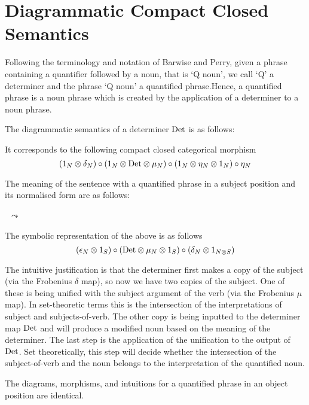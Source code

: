 \section{Diagrammatic  Compact Closed Semantics}


Following the terminology and notation of Barwise and  Perry, given a phrase containing a quantifier followed by a noun, that is `Q noun', we call `Q' a determiner and the phrase `Q noun' a quantified  phrase.Hence,  a quantified phrase is a noun phrase which is created by the application of a determiner to a noun phrase.  


The diagrammatic semantics of a determiner $\mathrm{Det}$ is as follows:

\begin{center}
\end{center}

\noindent
It corresponds to the following compact closed categorical morphism
{\small
\[
(1_N \otimes \delta_N) \circ (1_N \otimes \mathrm{Det} \otimes \mu_N) \circ (1_N \otimes \eta_N \otimes 1_N) \circ \eta_N 
\]}

\noindent
The meaning of the sentence with a quantified phrase in a subject position and its normalised form are as follows:


\begin{minipage}{20cm}
\begin{minipage}{7cm}
\end{minipage}
\ $\leadsto$ \
\begin{minipage}{5cm}
\end{minipage}
\end{minipage}


\noindent
The symbolic representation of the above is as follows
\[{\small
(\epsilon_N \otimes 1_S) \circ (\Det \otimes  \mu_N \otimes 1_S) \circ (\delta_N \otimes 1_{N \otimes S})}
\]


The intuitive justification  is that the determiner first makes a copy of the subject (via the Frobenius $\delta$ map), so now we have two copies of the subject. One of these is being unified with the subject argument of the verb (via the Frobenius $\mu$ map). In set-theoretic terms this is the intersection of the interpretations of subject and subjects-of-verb. The other copy is being inputted to the determiner map $\mathrm{Det}$ and will produce a modified noun based on the meaning of the determiner.  The last step is the application of the unification to the output of $\mathrm{Det}$. Set theoretically, this step will decide whether the intersection of the subject-of-verb and the noun belongs to the interpretation of the quantified noun. 

 
The diagrams,  morphisms, and intuitions for a quantified phrase in an object position are identical.

